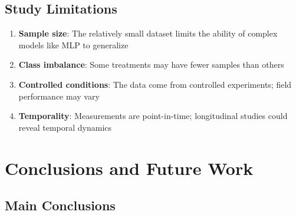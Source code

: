 \documentclass[12pt,a4paper]{article}
\begin{document}
\subsection{Study Limitations}

\begin{enumerate}
    \item \textbf{Sample size}: The relatively small dataset limits the ability of complex models like MLP to generalize
    \item \textbf{Class imbalance}: Some treatments may have fewer samples than others
    \item \textbf{Controlled conditions}: The data come from controlled experiments; field performance may vary
    \item \textbf{Temporality}: Measurements are point-in-time; longitudinal studies could reveal temporal dynamics
\end{enumerate}

\newpage
\section{Conclusions and Future Work}
\label{sec:conclusions}

\subsection{Main Conclusions}
\end{document}
